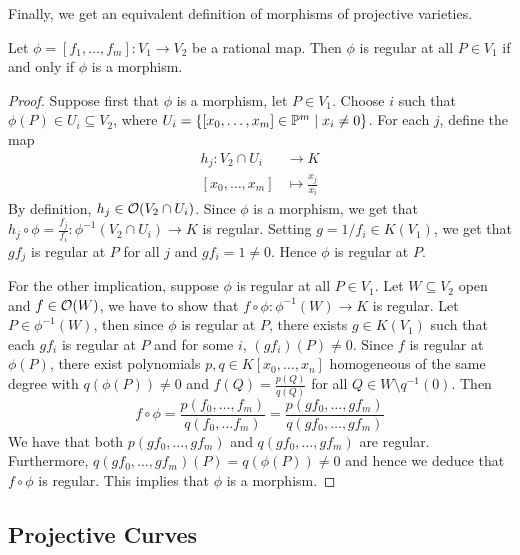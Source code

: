 Finally, we get an equivalent definition of morphisms of projective
varieties.

\begin{proposition}
	Let $\phi = [f_1, \dots, f_m]: V_1 \to V_2$ be a rational map. Then
	$\phi$ is regular at all $P \in V_1$ if and only if
	$\phi$ is a morphism.
\end{proposition}

\begin{proof}
	Suppose first that $\phi$ is a morphism, let $P \in V_1$.
	Choose $i$ such that $\phi(P) \in U_i \subseteq V_2$, 
	where $U_i = \{[x_0, \dots, x_m] \in \mathbb{P}^m \mid x_i \neq 0\}$.
	For each $j$, define the map
	\begin{align*}
		h_j: V_2\cap U_i &\to K\\
		[x_0, \dots, x_m] &\mapsto \frac{x_j}{x_i}
	\end{align*}
	By definition, $h_j \in \mathcal{O}(V_2\cap U_i)$.
	Since $\phi$ is a morphism, we get that
	$h_j \circ \phi = \frac{f_j}{f_i}: \phi^{-1}(V_2\cap U_i) \to K$ is regular.
	Setting $g = 1/f_i \in K(V_1)$, we get that
	$gf_j$ is regular at $P$ for all $j$ and $gf_i = 1 \neq 0$.
	Hence $\phi$ is regular at $P$.

	For the other implication, suppose $\phi$ is regular at all $P \in V_1$.
	Let $W \subseteq V_2$ open and $f \in \mathcal{O}(W)$, we have to show that
	$f\circ\phi: \phi^{-1}(W) \to K$ is regular.
	Let $P \in \phi^{-1}(W)$, then since $\phi$ is regular at $P$,
	there exists $g \in K(V_1)$ such that each $gf_i$ is regular at $P$
	and for some $i$, $(gf_i)(P) \neq 0$.
	Since $f$ is regular at $\phi(P)$, there exist polynomials
	$p, q \in K[x_0, \dots, x_n]$ homogeneous of the same degree
	with $q(\phi(P)) \neq 0$ and 
	$f(Q) = \frac{p(Q)}{q(Q)}$ for all $Q \in W\setminus q^{-1}(0)$. Then
	\begin{equation*}
		f \circ \phi = \frac{p(f_0, \dots, f_m)}{q(f_0, \dots f_m)}
		= \frac{p(gf_0, \dots, gf_m)}{q(gf_0, \dots, gf_m)}
	\end{equation*}
	We have that both $p(gf_0, \dots, gf_m)$ and $q(gf_0, \dots, gf_m)$ are
	regular. Furthermore, $q(gf_0, \dots, gf_m)(P) = q(\phi(P)) \neq 0$
	and hence we deduce that $f\circ \phi$ is regular.
	This implies that $\phi$ is a morphism.
\end{proof}

\subsection{Projective Curves}

